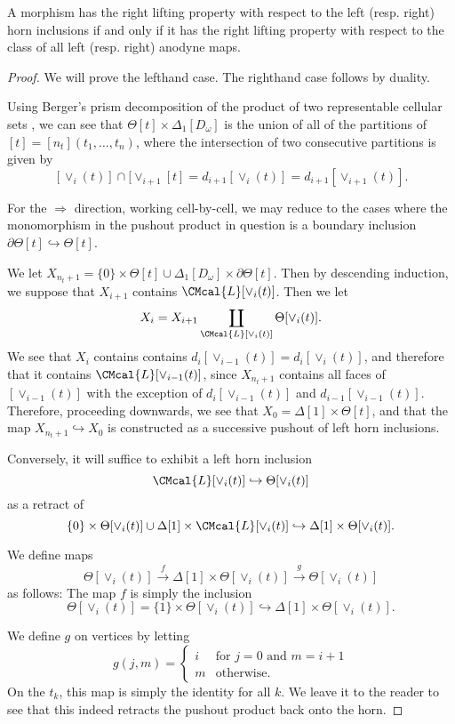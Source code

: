 \begin{thm} A morphism has the right lifting property with respect to the left (resp. right) horn inclusions if and only if it has the right lifting property with respect to the class of all left (resp. right) anodyne maps.  
\end{thm}
\begin{proof} We will prove the lefthand case.  The righthand case follows by duality. 

Using Berger's prism decomposition of the product of two representable cellular sets \cite{berger-cellular-nerve}, we can see that \(\Theta[t] \times \Delta_1[D_\omega]\) is the union of all of the partitions of \([t]=[n_t](t_1,\dots,t_n)\), where the intersection of two consecutive partitions is given by \[[\vee_i(t)]\cap [\vee_{i+1}[t]=d_{i+1}[\vee_i(t)]=d_{i+1}[\vee_{i+1}(t)].\]  

For the \(\Rightarrow\) direction, working cell-by-cell, we may reduce to the cases where the monomorphism in the pushout product in question is a boundary inclusion \(\partial\Theta[t]\hookrightarrow \Theta[t]\).  

We let \(X_{n_t+1}=\{0\}\times \Theta[t] \cup \Delta_1[D_\omega]\times \partial \Theta[t]\).  Then by descending induction, we suppose that \(X_{i+1}\) contains \(\CMcal{L}[\vee_i(t)]\).  Then we let \[X_i=X_{i+1}\coprod_{\CMcal{L}[\vee_i(t)]} \Theta[\vee_i(t)].\] We see that \(X_i\) contains contains \(d_i[\vee_{i-1}(t)]= d_i[\vee_{i}(t)]\), and therefore that it contains \(\CMcal{L}[\vee_{i-1}(t)]\), since \(X_{n_t+1}\) contains all faces of \([\vee_{i-1}(t)]\) with the exception of \(d_i[\vee_{i-1}(t)]\) and \(d_{i-1}[\vee_{i-1}(t)]\).  Therefore, proceeding downwards, we see that \(X_0=\Delta[1]\times \Theta[t]\), and that the map \(X_{n_t+1}\hookrightarrow X_0\) is constructed as a successive pushout of left horn inclusions.

Conversely, it will suffice to exhibit a left horn inclusion \[\CMcal{L}[\vee_{i}(t)]\hookrightarrow \Theta[\vee_{i}(t)]\] as a retract of \[\{0\}\times \Theta[\vee_{i}(t)]\cup \Delta[1]\times \CMcal{L}[\vee_{i}(t)] \hookrightarrow \Delta[1]\times \Theta[\vee_{i}(t)].\]  

We define maps \[\Theta[\vee_{i}(t)]\xrightarrow{f} \Delta[1]\times \Theta[\vee_{i}(t)] \xrightarrow{g} \Theta[\vee_{i}(t)]\] as follows:  The map \(f\) is simply the inclusion \[\Theta[\vee_{i}(t)]=\{1\}\times \Theta[\vee_{i}(t)]\hookrightarrow \Delta[1]\times \Theta[\vee_{i}(t)].\]

We define \(g\) on vertices by letting 
\[g(j,m)=
\begin{cases}i &\text{for \(j=0\) and \(m=i+1\)}\\
 m & \text{otherwise}.
\end{cases}\]
On the \(t_k\), this map is simply the identity for all \(k\).  We leave it to the reader to see that this indeed retracts the pushout product back onto the horn.
\end{proof}

